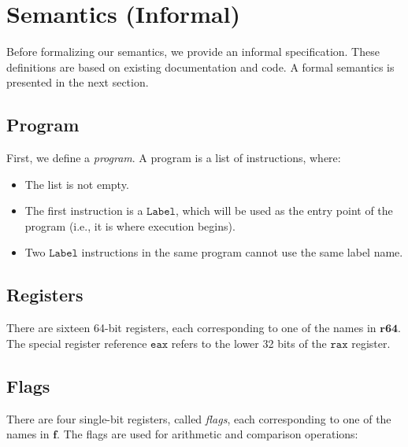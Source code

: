 \documentclass{article}
\newcommand{\nonterm}[1]{\ensuremath{\mathbf{#1}}}
\newcommand{\term}[1]{\ensuremath{\mathtt{#1}}}
\begin{document}
\section{Semantics (Informal)}

Before formalizing our semantics, we provide an informal specification. These
definitions are based on existing documentation and code. A formal semantics is
presented in the next section.  %

\subsection{Program}

First, we define a \emph{program}. A program is a list of instructions, where:

\begin{itemize}
\item The list is not empty.
\item The first instruction is a \term{Label}, which will be used as the entry
  point of the program (i.e., it is where execution begins).
\item Two \term{Label} instructions in the same program cannot use the same
  label name.
\end{itemize}

\subsection{Registers}

There are sixteen 64-bit registers, each corresponding to one of the names in
\nonterm{r64}. The special register reference \term{eax} refers to the lower 32
bits of the \term{rax} register.

\subsection{Flags}

There are four single-bit registers, called \emph{flags}, each corresponding to
one of the names in \nonterm{f}. The flags are used for arithmetic and
comparison operations:
\end{document}
